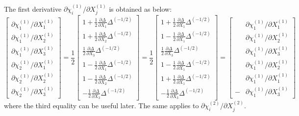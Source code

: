 \documentclass[12pt]{amsart}
\begin{document}
The first derivative $\partial\chi^{(1)}_i/\partial X^{(1)}_j$  is obtained as below:
\begin{equation}
  \label{eq:dchi_dx_1}
  \begin{bmatrix}
    \partial\chi^{(1)}_1/\partial X^{(1)}_1\\
    \partial\chi^{(1)}_1/\partial X^{(1)}_2\\
    \partial\chi^{(1)}_1/\partial X^{(1)}_3\\
    \partial\chi^{(1)}_2/\partial X^{(1)}_1\\
    \partial\chi^{(1)}_2/\partial X^{(1)}_2\\
    \partial\chi^{(1)}_2/\partial X^{(1)}_3
  \end{bmatrix}
  =
  \frac{1}{2}
  \begin{bmatrix}
     1 +  \frac{1}{2}\frac{\partial\Delta}{\partial X_1} \Delta^{(-1/2)}   \\
     1 +  \frac{1}{2}\frac{\partial\Delta}{\partial X_2} \Delta^{(-1/2)}   \\
          \frac{1}{2}\frac{\partial\Delta}{\partial X_3} \Delta^{(-1/2)}   \\
     1 -  \frac{1}{2}\frac{\partial\Delta}{\partial X_1} \Delta^{(-1/2)}   \\
     1 -  \frac{1}{2}\frac{\partial\Delta}{\partial X_2} \Delta^{(-1/2)}   \\
         -\frac{1}{2}\frac{\partial\Delta}{\partial X_3} \Delta^{(-1/2)}
  \end{bmatrix}
  =
  \frac{1}{2}
  \begin{bmatrix}
     1 +  \frac{1}{2}\frac{\partial\Delta}{\partial X_1} \Delta^{(-1/2)}   \\
     1 -  \frac{1}{2}\frac{\partial\Delta}{\partial X_1} \Delta^{(-1/2)}   \\
          \frac{1}{2}\frac{\partial\Delta}{\partial X_3} \Delta^{(-1/2)}   \\
     1 -  \frac{1}{2}\frac{\partial\Delta}{\partial X_1} \Delta^{(-1/2)}   \\
     1 +  \frac{1}{2}\frac{\partial\Delta}{\partial X_1} \Delta^{(-1/2)}   \\
       -  \frac{1}{2}\frac{\partial\Delta}{\partial X_3} \Delta^{(-1/2)}
  \end{bmatrix}
  =
  \begin{bmatrix}
     &\partial\chi^{(1)}_1/\partial X^{(1)}_1\\
     &\partial\chi^{(1)}_1/\partial X^{(1)}_2\\
     &\partial\chi^{(1)}_1/\partial X^{(1)}_3\\
     &\partial\chi^{(1)}_1/\partial X^{(1)}_2\\
     &\partial\chi^{(1)}_1/\partial X^{(1)}_1\\
    -&\partial\chi^{(1)}_1/\partial X^{(1)}_3
  \end{bmatrix}
\end{equation}
where the third equality can be useful later.
The same applies to $ \partial\chi^{(2)}_i/\partial X^{(2)}_j$.
\end{document}
